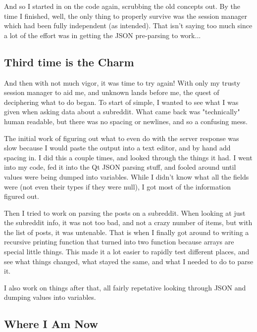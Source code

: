 \documentclass[12pt]{article}
\begin{document}
And so I started in on the code again, scrubbing the old concepts out.
By the time I finished, well, the only thing to properly survive was the session manager which had been fully independent (as intended).
That isn't saying too much since a lot of the effort was in getting the JSON pre-parsing to work...

\subsection{Third time is the Charm}

And then with not much vigor, it was time to try again!
With only my trusty session manager to aid me, and unknown lands before me, the quest of deciphering what to do began.
To start of simple, I wanted to see what I was given when asking data about a subreddit.
What came back was "technically" human readable, but there was no spacing or newlines, and so a confusing mess.

The initial work of figuring out what to even do with the server response was slow because I would paste the output into a text editor, and by hand add spacing in.
I did this a couple times, and looked through the things it had.
I went into my code, fed it into the Qt JSON parsing stuff, and fooled around until values were being dumped into variables.
While I didn't know what all the fields were (not even their types if they were null), I got most of the information figured out.

Then I tried to work on parsing the posts on a subreddit.
When looking at just the subreddit info, it was not too bad, and not a crazy number of items, but with the list of posts, it was untenable.
That is when I finally got around to writing a recursive printing function that turned into two function because arrays are special little things.
This made it a lot easier to rapidly test different places, and see what things changed, what stayed the same, and what I needed to do to parse it.

I also work on things after that, all fairly repetative looking through JSON and dumping values into variables.

\subsection{Where I Am Now}
\end{document}
